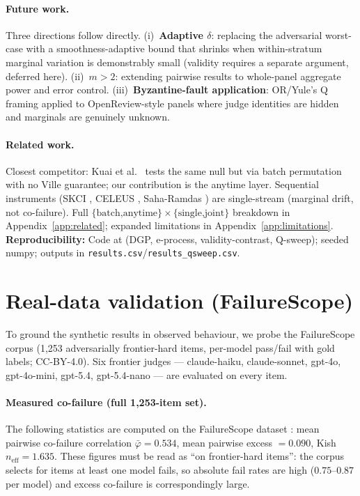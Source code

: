 \documentclass{article}
\begin{document}
\paragraph{Future work.}
Three directions follow directly. (i)~\textbf{Adaptive $\delta$}: replacing the
adversarial worst-case with a smoothness-adaptive bound that shrinks when
within-stratum marginal variation is demonstrably small (validity requires a
separate argument, deferred here). (ii)~\textbf{$m>2$}: extending pairwise
results to whole-panel aggregate power and error control.
(iii)~\textbf{Byzantine-fault application}: OR/Yule's Q framing applied to
OpenReview-style panels where judge identities are hidden and marginals are
genuinely unknown.

\paragraph{Related work.}
\label{sec:related}
Closest competitor: Kuai et al.\ \citep{kuai2604} tests the same null but via
batch permutation with no Ville guarantee; our contribution is the anytime layer.
Sequential instruments (SKCI \citep{he2606}, CELEUS \citep{celeus2606},
Saha-Ramdas \citep{saharamdas2607}) are single-stream (marginal drift, not
co-failure). Full $\{\text{batch,anytime}\}\times\{\text{single,joint}\}$
breakdown in Appendix~\ref{app:related}; expanded limitations in
Appendix~\ref{app:limitations}.
\textbf{Reproducibility:} Code at  (DGP, e-process,
validity-contrast, Q-sweep); seeded numpy; outputs in
\texttt{results.csv}/\texttt{results\_qsweep.csv}.




\appendix

\section{Real-data validation (FailureScope)}
\label{app:realdata}

To ground the synthetic results in observed behaviour, we probe the FailureScope
corpus \citep{saban2606,failurescope_data} (1{,}253 adversarially frontier-hard items,
per-model pass/fail with gold labels; CC-BY-4.0). Six frontier judges ---
claude-haiku, claude-sonnet, gpt-4o, gpt-4o-mini, gpt-5.4, gpt-5.4-nano --- are
evaluated on every item.

\paragraph{Measured co-failure (full 1{,}253-item set).}
The following statistics are computed on the FailureScope dataset \citep{failurescope_data}:
mean pairwise co-failure correlation $\bar\varphi = 0.534$, mean pairwise excess
$= 0.090$, Kish $n_{\mathrm{eff}} = 1.635$. These figures must be read as ``on
frontier-hard items'': the corpus selects for items at least one model fails, so
absolute fail rates are high ($0.75$--$0.87$ per model) and excess co-failure is
correspondingly large.
\end{document}
